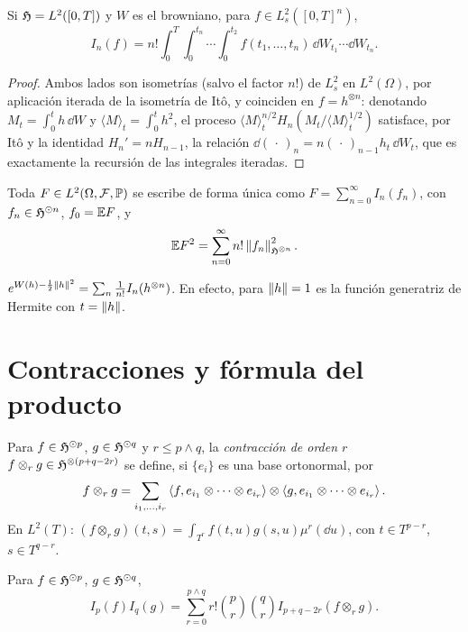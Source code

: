\begin{teorema}\label{teo:iteradas}
Si $\mathfrak{H}=L^2([0,T])$ y $W$ es el
browniano, para $f\in L^2_s([0,T]^n)$,
\[
  I_n(f)=n!\int_0^T\int_0^{t_n}\cdots\int_0^{t_2}f(t_1,\dots,t_n)\,\dd W_{t_1}\cdots\dd W_{t_n}.
\]
\end{teorema}

\begin{proof}
Ambos lados son isometrías (salvo el factor $n!$) de $L^2_s$ en $L^2(\Omega)$, por aplicación
iterada de la isometría de Itô, y coinciden en $f=h^{\otimes n}$: denotando $M_t=\int_0^th\,\dd W$ y $\langle M\rangle_t=\int_0^th^2$,
el proceso $\langle M\rangle_t^{n/2}H_n(M_t/\langle M\rangle_t^{1/2})$ satisface, por Itô y la identidad $H_n'=nH_{n-1}$, la relación
$\dd(\,\cdot\,)_n=n(\,\cdot\,)_{n-1}h_t\,\dd W_t$, que es exactamente la recursión de las integrales iteradas.
\end{proof}

\begin{corolario}\label{cor:caos-ito}
Toda $F\in L^2(\Omega,\mathcal{F},\mathbb{P})$ se escribe de forma
única como $F=\sum_{n=0}^\infty I_n(f_n)$, con $f_n\in\mathfrak{H}^{\odot n}$, $f_0=\mathbb{E} F$, y
\[
  \mathbb{E} F^2=\sum_{n=0}^\infty n!\left\lVert f_n\right\rVert^2_{\mathfrak{H}^{\otimes n}}.
\]
\end{corolario}

\begin{ejemplo}\label{ej:exponencial-caos}
$e^{W(h)-\frac12\left\lVert h\right\rVert^2}=\sum_n\frac1{n!}I_n(h^{\otimes n})$. En efecto, para $\left\lVert h\right\rVert=1$ es la función generatriz
de Hermite con $t=\left\lVert h\right\rVert$.
\end{ejemplo}

\section{Contracciones y fórmula del producto}
Para $f\in\mathfrak{H}^{\odot p}$, $g\in\mathfrak{H}^{\odot q}$ y $r\le p\wedge q$, la \emph{contracción de orden $r$} $f\otimes_rg\in\mathfrak{H}^{\otimes(p+q-2r)}$ se define, si
$\{e_i\}$ es una base ortonormal, por
\[
  f\otimes_rg=\sum_{i_1,\dots,i_r}\left\langle f, e_{i_1}\otimes\dots\otimes e_{i_r}\right\rangle\otimes\left\langle g, e_{i_1}\otimes\dots\otimes e_{i_r}\right\rangle.
\]
En $L^2(T)$: $(f\otimes_rg)(t,s)=\int_{T^r}f(t,u)g(s,u)\mu^r(\dd u)$, con $t\in T^{p-r}$, $s\in T^{q-r}$.

\begin{teorema}\label{teo:producto}
Para $f\in\mathfrak{H}^{\odot p}$, $g\in\mathfrak{H}^{\odot q}$,
\[
  I_p(f)I_q(g)=\sum_{r=0}^{p\wedge q}r!\binom pr\binom qrI_{p+q-2r}(f\otimes_rg).
\]
\end{teorema}

